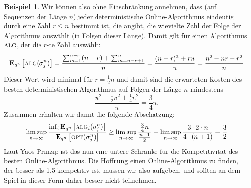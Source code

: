 \documentclass[a4paper,ngerman,12pt,bibtotoc]{scrartcl}
\theoremstyle{definition}
\newtheorem{bsp}[defn]{Beispiel}
\theoremstyle{plain}
\theoremstyle{remark}
\renewcommand{\_}{\mathpunct{.}\,}
\newcommand{\?}{\,{:}\,}
\newcommand{\Alg}{\ensuremath{\textsc{alg}}}
\newcommand{\Opt}{\ensuremath{\textsc{opt}}}
\newcommand{\EE}{\mathbf{E}}
\newcommand{\sjn}{\sigma_j^n}
\begin{document}
\begin{bsp}
		Wir können also ohne Einschränkung annehmen, dass (auf Sequenzen der Länge $n$) jeder deterministische Online-Algorithmus eindeutig durch eine Zahl $r\leq n$ bestimmt ist, die angibt, die wievielte Zahl der Folge der Algorithmus auswählt (in Folgen dieser Länge). Damit gilt für einen Algorithmus $\Alg$, der die $r$-te Zahl auswählt:
		\begin{equation*}
		\EE_{q^n}\left[\Alg(\sigma^n_j)\right] = \frac{\sum_{m=1}^{n-r}(n-r) + \sum_{m=n-r+1}^{n}}{n} = \frac{(n-r)^2 + rn}{n} = \frac{n^2-nr+r^2}{n}
		\end{equation*}	
		Dieser Wert wird minimal für $r = \frac{1}{2}n$ und damit sind die erwarteten Kosten des besten deterministischen Algorithmus auf Folgen der Länge $n$ mindestens
		\[\frac{n^2-\frac{1}{2}n^2 + \frac{1}{4}n^2}{n} = \frac{3}{4}n.\]
		Zusammen erhalten wir damit die folgende Abschätzung:
		\[\limsup_{n\to\infty} \frac{\inf_i\EE_{q^n}\left[\Alg_i(\sjn)\right]}{\EE_{q^n}\left[\Opt(\sjn)\right]} \geq \limsup_{n\to\infty}\frac{\frac{3}{4}n}{\frac{n+1}{2}} = \limsup_{n\to\infty} \frac{3\cdot 2\cdot n}{4\cdot (n+1)} = \frac{3}{2}\]
		Laut Yaos Prinzip ist das nun eine untere Schranke für die Kompetitivität des besten Online-Algorithmus. Die Hoffnung einen Online-Algorithmus zu finden, der besser als 1,5-kompetitiv ist, müssen wir also aufgeben, und sollten an dem Spiel in dieser Form daher besser nicht teilnehmen.
	\end{bsp}	

	\newpage
	\nocite{*}
	\printbibliography		
			
\end{document}
